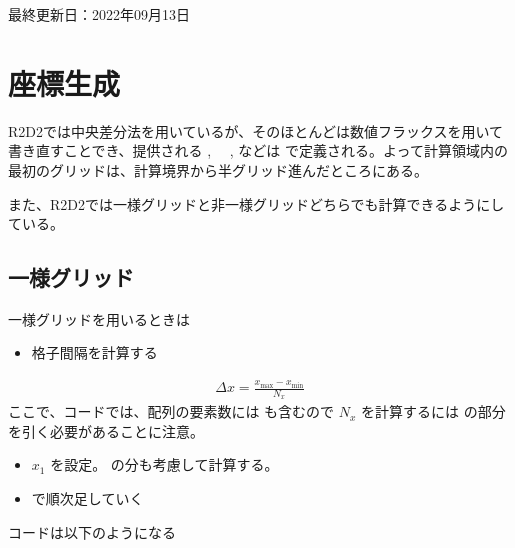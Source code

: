 \documentclass[letterpaper,10pt,dvipdfmx,report]{sphinxmanual}
\begin{document}
\sphinxAtStartPar
最終更新日：2022年09月13日

\sphinxstepscope


\chapter{座標生成}
\label{\detokenize{geometry:id1}}\label{\detokenize{geometry::doc}}
\sphinxAtStartPar
R2D2では中央差分法を用いているが、そのほとんどは数値フラックスを用いて書き直すことでき、提供される  , 　,  などは  で定義される。よって計算領域内の最初のグリッドは、計算境界から半グリッド進んだところにある。

\sphinxAtStartPar
また、R2D2では一様グリッドと非一様グリッドどちらでも計算できるようにしている。


\section{一様グリッド}
\label{\detokenize{geometry:id2}}
\sphinxAtStartPar
一様グリッドを用いるときは
\begin{itemize}
\item {} 
\sphinxAtStartPar
格子間隔を計算する

\end{itemize}
\begin{equation*}
\begin{split}\Delta x = \frac{x_\mathrm{max} - x_\mathrm{min}}{N_x}\end{split}
\end{equation*}
\sphinxAtStartPar
ここで、コードでは、配列の要素数には  も含むので
\(N_x\) を計算するには  の部分を引く必要があることに注意。
\begin{itemize}
\item {} 
\sphinxAtStartPar
\(x_1\) を設定。 の分も考慮して計算する。

\item {} 
\sphinxAtStartPar
{} で順次足していく

\end{itemize}

\sphinxAtStartPar
コードは以下のようになる
\end{document}
